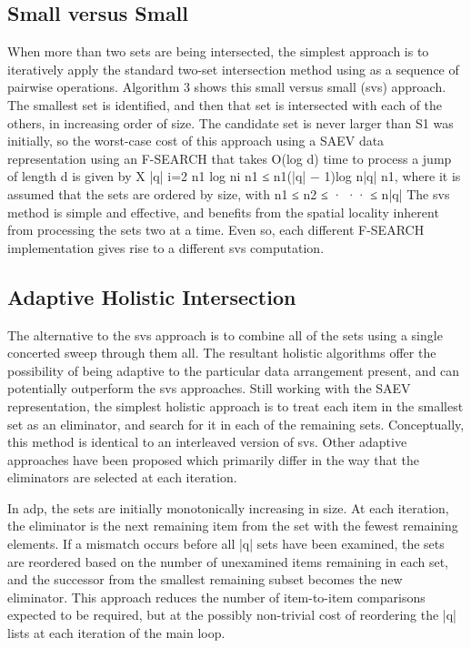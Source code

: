 \documentclass[paper=a4, fontsize=11pt]{scrartcl} %
\numberwithin{equation}{section} %
\numberwithin{figure}{section} %
\numberwithin{table}{section} %
\begin{document}
\subsection{Small versus Small}

When more than two sets are being intersected, the simplest approach is to iteratively apply the standard two-set intersection method using as a sequence of pairwise operations. Algorithm 3 shows this small versus small (svs) approach. The smallest set is identified, and then that set is intersected with each of the others, in increasing order of size. The candidate set is never larger than S1 was initially, so the worst-case cost of this approach using a SAEV data representation using an F-SEARCH that takes O(log d) time to process a jump of length d is given by X |q| i=2 n1 log ni n1 ≤ n1(|q| − 1)log n|q| n1, where it is assumed that the sets are ordered by size, with n1 ≤ n2 ≤ · ·· ≤ n|q| The svs method is simple and effective, and benefits from the spatial locality inherent from
processing the sets two at a time. Even so, each different F-SEARCH implementation gives rise to a different svs computation.

\subsection{Adaptive Holistic Intersection}
The alternative to the svs approach is to combine all of the sets using a single concerted sweep through them all. The resultant holistic algorithms offer the possibility of being adaptive to the particular data arrangement present, and can potentially outperform the svs approaches. Still working with the SAEV representation, the simplest holistic approach is to treat each item in the smallest set as an eliminator, and search for it in each of the remaining sets. Conceptually, this method is identical to an interleaved version of svs. Other adaptive approaches have been proposed which primarily differ in the way that the eliminators are selected at each iteration. 

In adp, the sets are initially monotonically increasing in size.
At each iteration, the eliminator is the next remaining item from the set with the fewest remaining elements. If a mismatch occurs before all |q| sets have been examined, the sets are reordered based on the number of unexamined items remaining in each set, and the successor from the smallest remaining subset becomes the new eliminator. This approach reduces the number of item-to-item comparisons expected to be required, but at the possibly non-trivial cost of reordering the |q| lists at each iteration of the main loop.
\end{document}
